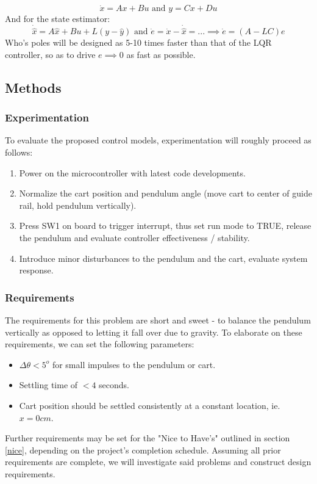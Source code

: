 \documentclass[12pt]{article}
\begin{document}
\begin{equation}
    \dot{x} = Ax + Bu \textrm{ and }
    y = Cx + Du
\end{equation}
And for the state estimator:
\begin{equation}
    \dot{\hat{x}} = A\hat{x} + Bu + L(y-\hat{y}) \textrm{ and }
    \dot{e} = \dot{x} - \dot{\hat{x}} = ... \implies \dot{e} = (A - LC)e
    \label{eq}
\end{equation}
Who's poles will be designed as 5-10 times faster than that of the LQR controller, so as to drive \textbf{$e\implies0$} as fast as possible.
\subsection{Methods}
\subsubsection{Experimentation}
To evaluate the proposed control models, experimentation will roughly proceed as follows:
\begin{enumerate}
    \item Power on the microcontroller with latest code developments.
    \item Normalize the cart position and pendulum angle (move cart to center of guide rail, hold pendulum vertically).
    \item Press SW1 on board to trigger interrupt, thus set run mode to TRUE, release the pendulum and evaluate controller effectiveness / stability.
    \item Introduce minor disturbances to the pendulum and the cart, evaluate system response.
\end{enumerate}
    
\subsubsection{Requirements}
The requirements for this problem are short and sweet - to balance the pendulum vertically as opposed to letting it fall over due to gravity. To elaborate on these requirements, we can set the following parameters:
\begin{itemize}
    \item $\Delta \theta < 5^o$ for small impulses to the pendulum or cart.
    \item Settling time of $< 4$ seconds.
    \item Cart position should be settled consistently at a constant location, ie. $x=0cm$.
\end{itemize}
Further requirements may be set for the "Nice to Have's" outlined in section \ref{nice}, depending on the project's completion schedule. Assuming all prior requirements are complete, we will investigate said problems and construct design requirements. 
\end{document}
